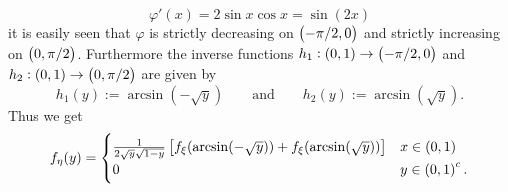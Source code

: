 \begin{enumerate}[label = \textbf{Exercise \arabic*.},wide = 0pt, itemsep=1.5ex]
\begin{enumerate}[label = \arabic*.,wide = 0pt, itemsep=1.5ex]
\begin{equation}
					\varphi'(x) = 2\sin x \cos x = \sin(2x)
				\end{equation}
				\noindent it is easily seen that $\varphi$ is strictly decreasing on $\intoo{-\pi/2,0}$ and strictly increasing on $\intoo{0,\pi/2}$. Furthermore the inverse functions $h_1: \intoo{0,1} \to \intoo{-\pi/2,0}$ and $h_2: \intoo{0,1} \to \intoo{0,\pi/2}$ are given by 
				\begin{equation}
					h_1(y) := \arcsin(-\sqrt{y}) \qquad \text{and} \qquad h_2(y) := \arcsin(\sqrt{y}).
				\end{equation}
				Thus we get
				\begin{align*}
					f_\eta(y) = \begin{cases}
						\frac{1}{2\sqrt{y}\sqrt{1 - y}}\sbr{f_\xi(\arcsin(-\sqrt{y})) + f_\xi(\arcsin(\sqrt{y}))} & x \in \intoo{0,1}\\
						0 & y \in \intoo{0,1}^c.
					\end{cases}
				\end{align*}


\end{enumerate}
\end{enumerate}
